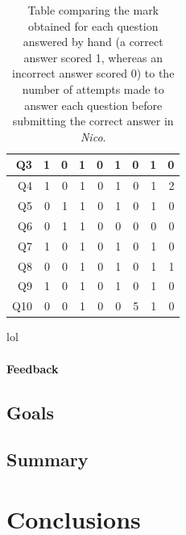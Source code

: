 \documentclass[12pt,twoside,notitlepage,xetex]{report}
\begin{document}
\begin{center}
\begin{table}[H]
\begin{center}
\begin{tabular}{|r||r|r||r|r||r|r||r|r|}
Q3 & 1 & 0 & 1 & 0 & 1 & 0 & 1 & 0\\ \hline
Q4 & 1 & 0 & 1 & 0 & 1 & 0 & 1 & 2\\ \hline
Q5 & 0 & 1 & 1 & 0 & 1 & 0 & 1 & 0\\ \hline
Q6 & 0 & 1 & 1 & 0 & 0 & 0 & 0 & 0\\ \hline
Q7 & 1 & 0 & 1 & 0 & 1 & 0 & 1 & 0\\ \hline
Q8 & 0 & 0 & 1 & 0 & 1 & 0 & 1 & 1\\ \hline
Q9 & 1 & 0 & 1 & 0 & 1 & 0 & 1 & 0\\ \hline
Q10 & 0 & 0 & 1 & 0 & 0 & 5 & 1 & 0\\
\hline
\end{tabular}
\end{center}
\caption{Table comparing the mark obtained for each question answered by hand (a correct answer scored 1, whereas an incorrect answer scored 0) to the number of attempts made to answer each question before submitting the correct answer in \emph{Nico}.}
\end{table}
\end{center}

lol

\subsubsection{Feedback}

\section{Goals}

\section{Summary}


\cleardoublepage
\chapter{Conclusions}
\end{document}

